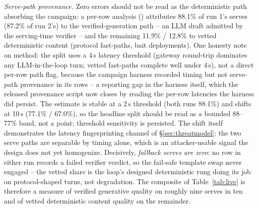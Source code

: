\emph{Serve-path provenance.} Zero errors should not be read as the
deterministic path absorbing the campaign: a per-row analysis
() attributes 88.1\% of run 1's serves
(87.2\% of run 2's) to the verified-generation
path -- an LLM draft admitted by the serving-time verifier -- and the
remaining 11.9\% / 12.8\% to vetted deterministic content (protocol
fast-paths, bait deployments). One honesty note on method: the split
uses a 4\,s latency threshold (gateway round-trip dominates any
LLM-in-the-loop turn; vetted fast-paths complete well under 4\,s), not
a direct per-row path flag, because the campaign harness recorded
timing but not serve-path provenance in its rows -- a reporting gap in
the harness itself, which the released provenance script now closes by
reading the per-row latencies the harness did persist. The estimate is
stable at a 2\,s threshold (both runs 88.1\%) and shifts at 10\,s
(77.1\% / 67.0\%), so the headline split should be read as a bounded
88--77\% band, not a point; threshold sensitivity is persisted. The
shift itself demonstrates the latency fingerprinting channel of
\S\ref{sec:threatmodel}: the two serve paths are separable by timing
alone, which is an attacker-usable signal the design does not yet
homogenize. Decisively,
\emph{fallback serves are zero}: no row in either run records a failed
verifier verdict, so the fail-safe template swap never engaged -- the
vetted share is the loop's designed deterministic rung doing its job on
protocol-shaped turns, not degradation. The composite of Table~\ref{tab:live}
is therefore a measure of verified generative quality on roughly nine
serves in ten and of vetted deterministic content quality on the
remainder.

